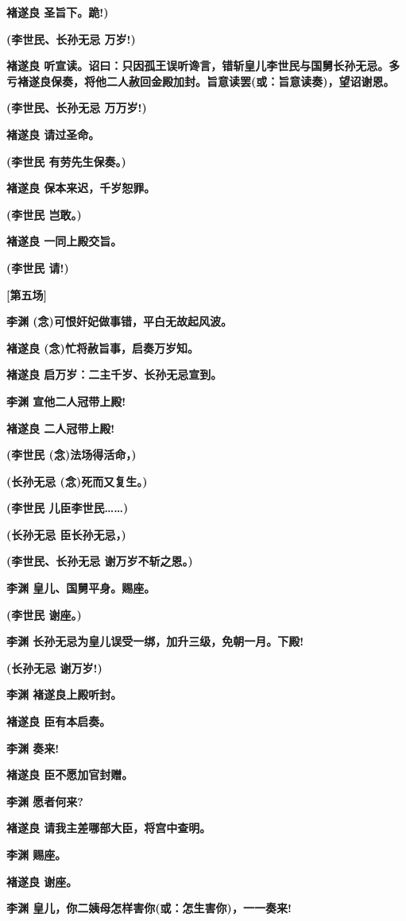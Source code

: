 \textbf{褚遂良 圣旨下。跪!)}

\textbf{(李世民、长孙无忌 万岁!)}

\textbf{褚遂良
听宣读。诏曰：只因孤王误听谗言，错斩皇儿李世民与国舅长孙无忌。多亏褚遂良保奏，将他二人赦回金殿加封。旨意读罢(或：旨意读奏)，望诏谢恩。}

\textbf{(李世民、长孙无忌 万万岁!)}

\textbf{褚遂良 请过圣命。}

\textbf{(李世民 有劳先生保奏。)}

\textbf{褚遂良 保本来迟，千岁恕罪。}

\textbf{(李世民 岂敢。)}

\textbf{褚遂良 一同上殿交旨。}

\textbf{(李世民 请!)}

\textbf{{[}第五场{]}}

\textbf{李渊 (念)可恨奸妃做事错，平白无故起风波。}

\textbf{褚遂良 (念)忙将赦旨事，启奏万岁知。}

\textbf{褚遂良 启万岁：二主千岁、长孙无忌宣到。}

\textbf{李渊 宣他二人冠带上殿!}

\textbf{褚遂良 二人冠带上殿!}

\textbf{(李世民 (念)法场得活命，)}

\textbf{(长孙无忌 (念)死而又复生。)}

\textbf{(李世民 儿臣李世民\ldots{}\ldots{})}

\textbf{(长孙无忌 臣长孙无忌，)}

\textbf{(李世民、长孙无忌 谢万岁不斩之恩。)}

\textbf{李渊 皇儿、国舅平身。赐座。}

\textbf{(李世民 谢座。)}

\textbf{李渊 长孙无忌为皇儿误受一绑，加升三级，免朝一月。下殿!}

\textbf{(长孙无忌 谢万岁!)}

\textbf{李渊 褚遂良上殿听封。}

\textbf{褚遂良 臣有本启奏。}

\textbf{李渊 奏来!}

\textbf{褚遂良 臣不愿加官封赠。}

\textbf{李渊 愿者何来?}

\textbf{褚遂良 请我主差哪部大臣，将宫中查明。}

\textbf{李渊 赐座。}

\textbf{褚遂良 谢座。}

\textbf{李渊 皇儿，你二姨母怎样害你(或：怎生害你)，一一奏来!}

